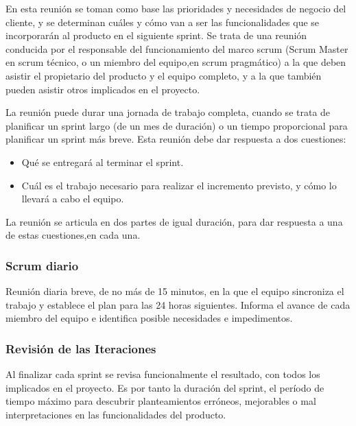 	En esta reunión se toman como base las prioridades y necesidades de negocio del cliente, y se determinan cuáles y cómo van a ser las funcionalidades que se incorporarán al producto en el siguiente sprint. Se trata de  una reunión conducida por  el responsable del funcionamiento  del marco scrum (Scrum Master en scrum técnico, o un miembro del equipo,en scrum pragmático) a la que deben asistir el propietario del producto y el equipo completo, y a la que también pueden asistir otros implicados en el proyecto.

	La reunión puede durar una jornada de trabajo completa, cuando se trata de planificar un sprint largo (de un mes de duración) o un tiempo proporcional para planificar un sprint más breve. Esta reunión debe dar respuesta a dos cuestiones:

	\begin{itemize}
		\item Qué se entregará al terminar el sprint.

		\item Cuál es el trabajo necesario para realizar el incremento previsto, y cómo lo llevará a cabo el equipo.
	\end{itemize}

\setlength{\parskip}{0mm}
	La  reunión  se  articula  en  dos  partes  de  igual  duración,  para  dar  respuesta  a  una  de  estas  cuestiones,en cada una.
	
\setlength{\parskip}{0mm}

\subsubsection{Scrum diario}
\setlength{\parskip}{5mm}

	Reunión diaria breve, de no más de 15 minutos, en la que el equipo sincroniza el trabajo y establece el plan para las 24 horas siguientes. Informa el avance de cada miembro del equipo e identifica posible necesidades e impedimentos.
	
\setlength{\parskip}{0mm}

\subsubsection{Revisión de las Iteraciones}
\setlength{\parskip}{5mm}

	Al finalizar cada sprint se revisa funcionalmente el resultado, con todos los implicados en el proyecto. Es por tanto la duración del sprint, el período de tiempo máximo para descubrir planteamientos erróneos, mejorables o mal interpretaciones en las funcionalidades del producto.
	
